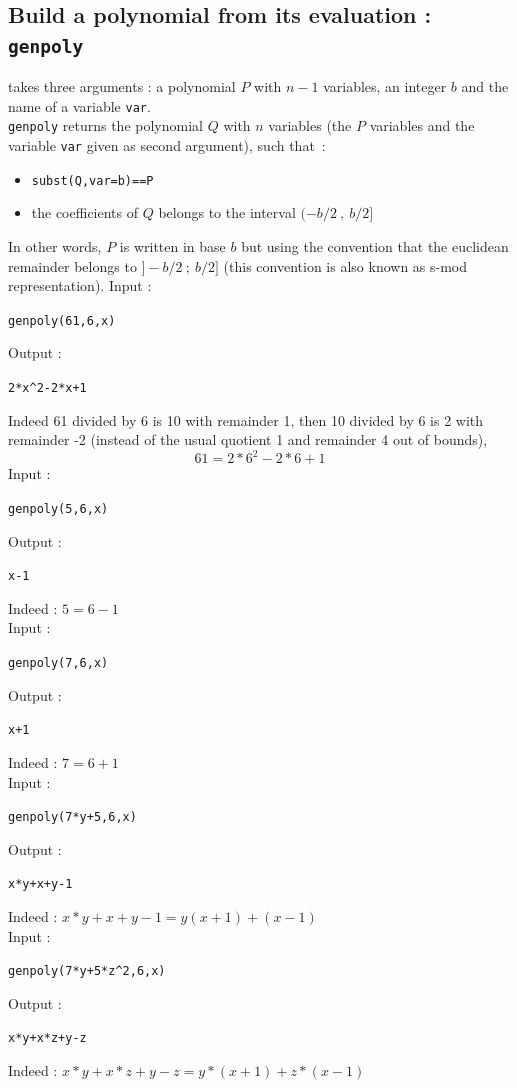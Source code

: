 \documentclass[a4paper,11pt]{book}
\begin{document}
\subsection{Build a polynomial from its evaluation : {\tt genpoly}}
 takes three arguments : a polynomial $P$ with $n-1$ 
variables, an integer $b$ and the name of a variable {\tt var}.\\ 
{\tt genpoly} returns the polynomial $Q$ with $n$ variables (the $P$ variables
and the variable {\tt var} given as second argument), such that~:
\begin{itemize}
\item {\tt subst(Q,var=b)==P} 
\item the coefficients of $Q$ belongs to the interval  $(-b/2 \ , \ b/2]$
\end{itemize}
In other words, $P$ is written in base $b$ but using the convention
that the euclidean remainder belongs to $]-b/2 \ ; \ b/2]$ 
(this convention is also known as s-mod representation).
Input :
\begin{center}{\tt genpoly(61,6,x) }\end{center}
Output :
\begin{center}{\tt 2*x\verb|^|2-2*x+1}\end{center}
Indeed 61 divided by 6 is 10 with remainder 1, then 10 divided by 6 is 2
with remainder -2 (instead of the usual quotient 1 and remainder 4 out of bounds),
\[ 61=2*6^2-2*6+1 \]
Input :
\begin{center}{\tt genpoly(5,6,x) }\end{center}
Output :
\begin{center}{\tt x-1}\end{center}
Indeed : $5=6-1$\\
Input :
\begin{center}{\tt genpoly(7,6,x) }\end{center}
Output :
\begin{center}{\tt x+1}\end{center}
Indeed : $7=6+1$\\
Input :
\begin{center}{\tt genpoly(7*y+5,6,x) }\end{center}
Output :
\begin{center}{\tt x*y+x+y-1}\end{center}
Indeed : $x*y+x+y-1=y(x+1)+(x-1)$\\
Input :
\begin{center}{\tt genpoly(7*y+5*z\verb|^2|,6,x)}\end{center}
Output :
\begin{center}{\tt x*y+x*z+y-z}\end{center}
Indeed : $x*y+x*z+y-z=y*(x+1)+z*(x-1)$
\end{document}
